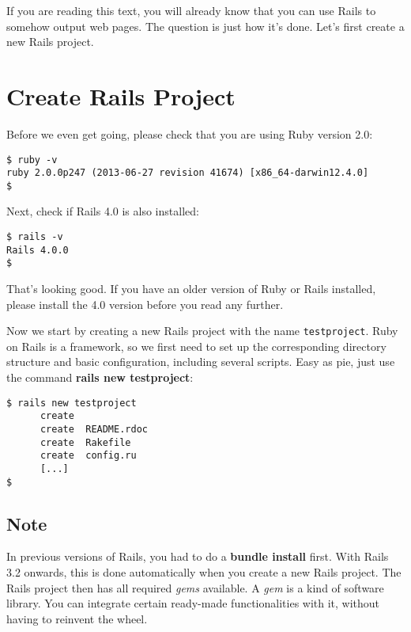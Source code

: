 \documentclass[a4paper]{book}
\begin{document}
If you are reading this text, you will already know that you can use Rails to somehow output web pages. The question is just how it's done. Let's first create a new Rails project.

\section{Create Rails Project}\label{create-rails-project}

Before we even get going, please check that you are using Ruby version 2.0:

\begin{shaded}\begin{verbatim}
$ ruby -v
ruby 2.0.0p247 (2013-06-27 revision 41674) [x86_64-darwin12.4.0]
$
\end{verbatim}\end{shaded}

Next, check if Rails 4.0 is also installed:

\begin{shaded}\begin{verbatim}
$ rails -v
Rails 4.0.0
$
\end{verbatim}\end{shaded}

That's looking good. If you have an older version of Ruby or Rails installed, please install the 4.0 version before you read any further.

Now we start by creating a new Rails project with the name \texttt{testproject}. Ruby on Rails is a framework, so we first need to set up the corresponding directory structure and basic configuration, including several scripts. Easy as pie, just use the command \textbf{rails new testproject}:

\begin{shaded}\begin{verbatim}
$ rails new testproject
      create  
      create  README.rdoc
      create  Rakefile
      create  config.ru
      [...]
$
\end{verbatim}\end{shaded}

\subsection{Note}\label{note-13}

In previous versions of Rails, you had to do a \textbf{bundle install} first. With Rails 3.2 onwards, this is done automatically when you create a new Rails project. The Rails project then has all required \emph{gems} available. A \emph{gem} is a kind of software library. You can integrate certain ready-made functionalities with it, without having to reinvent the wheel.
\end{document}
